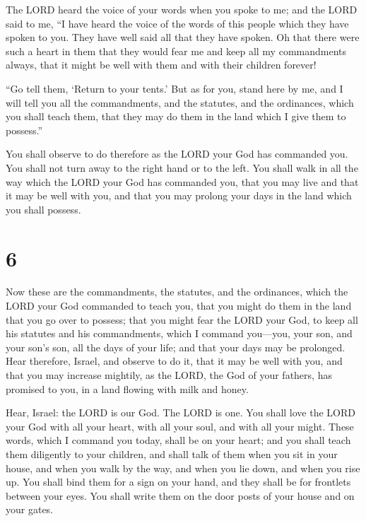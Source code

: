  The LORD heard the voice of your words when you spoke to
me; and the LORD said to me, ``I have heard the voice of the words of
this people which they have spoken to you. They have well said all that
they have spoken.  Oh that there were such a heart in
them that they would fear me and keep all my commandments always, that
it might be well with them and with their children forever!

 ``Go tell them, `Return to your tents.' 
But as for you, stand here by me, and I will tell you all the
commandments, and the statutes, and the ordinances, which you shall
teach them, that they may do them in the land which I give them to
possess.''

 You shall observe to do therefore as the LORD your God
has commanded you. You shall not turn away to the right hand or to the
left.  You shall walk in all the way which the LORD your
God has commanded you, that you may live and that it may be well with
you, and that you may prolong your days in the land which you shall
possess.

\hypertarget{section-5}{%
\section{6}\label{section-5}}

 Now these are the commandments, the statutes, and the
ordinances, which the LORD your God commanded to teach you, that you
might do them in the land that you go over to possess; 
that you might fear the LORD your God, to keep all his statutes and his
commandments, which I command you---you, your son, and your son's son,
all the days of your life; and that your days may be prolonged.
 Hear therefore, Israel, and observe to do it, that it may
be well with you, and that you may increase mightily, as the LORD, the
God of your fathers, has promised to you, in a land flowing with milk
and honey.

 Hear, Israel: the LORD is our God. The LORD is one.
 You shall love the LORD your God with all your heart,
with all your soul, and with all your might.  These words,
which I command you today, shall be on your heart;  and
you shall teach them diligently to your children, and shall talk of them
when you sit in your house, and when you walk by the way, and when you
lie down, and when you rise up.  You shall bind them for a
sign on your hand, and they shall be for frontlets between your eyes.
 You shall write them on the door posts of your house and
on your gates.

